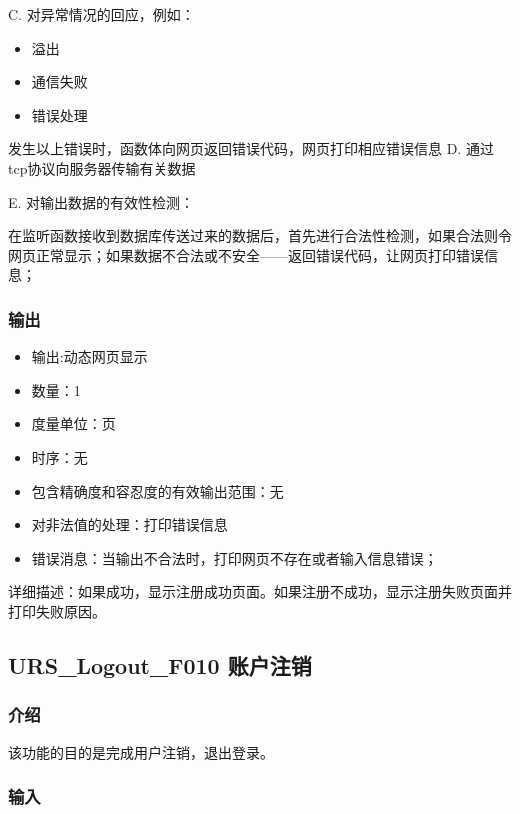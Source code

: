		 
		 C. 对异常情况的回应，例如：
		 \begin{adjustwidth}{2cm}{1cm}\qquad
			 \begin{itemize}
				 \item 溢出
				 \item 通信失败
				 \item 错误处理
			 \end{itemize}		
		 \end{adjustwidth}
		 
			 发生以上错误时，函数体向网页返回错误代码，网页打印相应错误信息
		 D. 通过tcp协议向服务器传输有关数据
				 
		 E. 对输出数据的有效性检测：
		 
		 在监听函数接收到数据库传送过来的数据后，首先进行合法性检测，如果合法则令网页正常显示；如果数据不合法或不安全——返回错误代码，让网页打印错误信息；
		 
		 \subsubsection{输出}
		 \begin{itemize}
			 \item	输出:动态网页显示
			 \item	数量：1
			 \item	度量单位：页
			 \item	时序：无
			 \item	包含精确度和容忍度的有效输出范围：无
			 \item	对非法值的处理：打印错误信息
			 \item	错误消息：当输出不合法时，打印网页不存在或者输入信息错误；
			\end{itemize}
			详细描述：如果成功，显示注册成功页面。如果注册不成功，显示注册失败页面并打印失败原因。






			\subsection{URS\_Logout\_F010 账户注销}

			\subsubsection{介绍}
			该功能的目的是完成用户注销，退出登录。
			\subsubsection{输入}
			
